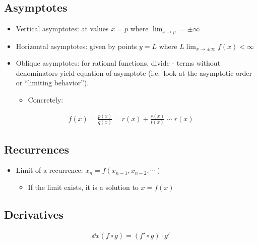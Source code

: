 \hypertarget{asymptotes}{%
\subsection{Asymptotes}\label{asymptotes}}

\begin{itemize}
\tightlist
\item
  Vertical asymptotes: at values \(x=p\) where
  \(\lim_{x\to p} = \pm\infty\)
\item
  Horizontal asymptotes: given by points \(y=L\) where
  \(L \lim_{x\to\pm\infty} f(x) < \infty\)
\item
  Oblique asymptotes: for rational functions, divide - terms without
  denominators yield equation of asymptote (i.e.~look at the asymptotic
  order or ``limiting behavior'').

  \begin{itemize}
  \tightlist
  \item
    Concretely:
  \end{itemize}
\end{itemize}

\begin{align*}
f(x) = \frac{p(x)}{q(x)} = r(x) + \frac{s(x)}{t(x)} \sim r(x)
\end{align*}

\hypertarget{recurrences}{%
\subsection{Recurrences}\label{recurrences}}

\begin{itemize}
\tightlist
\item
  Limit of a recurrence: \(x_n = f(x_{n-1}, x_{n-2}, \cdots)\)

  \begin{itemize}
  \tightlist
  \item
    If the limit exists, it is a solution to \(x = f(x)\)
  \end{itemize}
\end{itemize}

\hypertarget{derivatives}{%
\subsection{Derivatives}\label{derivatives}}

\begin{proposition}

\begin{align*}
\dd{}{x}(f\circ g) = (f' \circ g) \cdot g'
\end{align*}

\end{proposition}

